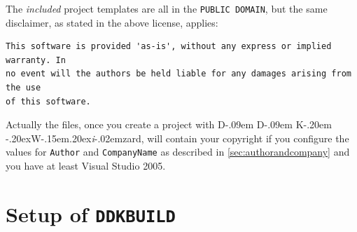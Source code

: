 \documentclass[a4paper,titlepage]{report}
\def\ddkwiz{D\kern-.09em D\kern-.09em K\kern-.20em \raise-.20ex\hbox{W}\kern-.15em\raise.20ex\hbox{\it{i}}\kern-.02em{zard}}
\begin{document}
The \emph{included} project templates are all in the \texttt{PUBLIC DOMAIN}, but the same
disclaimer, as stated in the above license, applies:

\begin{verbatim}
This software is provided 'as-is', without any express or implied warranty. In
no event will the authors be held liable for any damages arising from the use
of this software.
\end{verbatim}

Actually the files, once you create a project with \ddkwiz{}, will contain your
copyright if you configure the values for \texttt{Author} and \texttt{CompanyName}
as described in \autoref{sec:authorandcompany} and you have at least Visual
Studio 2005.

\chapter{Setup of \texttt{DDKBUILD}}\thispagestyle{fancy}
\end{document}
